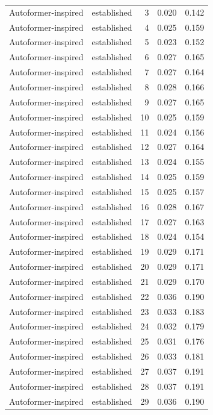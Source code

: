 \begin{tabular}{llrrr}
Autoformer-inspired & established & 3 & 0.020 & 0.142 \\
Autoformer-inspired & established & 4 & 0.025 & 0.159 \\
Autoformer-inspired & established & 5 & 0.023 & 0.152 \\
Autoformer-inspired & established & 6 & 0.027 & 0.165 \\
Autoformer-inspired & established & 7 & 0.027 & 0.164 \\
Autoformer-inspired & established & 8 & 0.028 & 0.166 \\
Autoformer-inspired & established & 9 & 0.027 & 0.165 \\
Autoformer-inspired & established & 10 & 0.025 & 0.159 \\
Autoformer-inspired & established & 11 & 0.024 & 0.156 \\
Autoformer-inspired & established & 12 & 0.027 & 0.164 \\
Autoformer-inspired & established & 13 & 0.024 & 0.155 \\
Autoformer-inspired & established & 14 & 0.025 & 0.159 \\
Autoformer-inspired & established & 15 & 0.025 & 0.157 \\
Autoformer-inspired & established & 16 & 0.028 & 0.167 \\
Autoformer-inspired & established & 17 & 0.027 & 0.163 \\
Autoformer-inspired & established & 18 & 0.024 & 0.154 \\
Autoformer-inspired & established & 19 & 0.029 & 0.171 \\
Autoformer-inspired & established & 20 & 0.029 & 0.171 \\
Autoformer-inspired & established & 21 & 0.029 & 0.170 \\
Autoformer-inspired & established & 22 & 0.036 & 0.190 \\
Autoformer-inspired & established & 23 & 0.033 & 0.183 \\
Autoformer-inspired & established & 24 & 0.032 & 0.179 \\
Autoformer-inspired & established & 25 & 0.031 & 0.176 \\
Autoformer-inspired & established & 26 & 0.033 & 0.181 \\
Autoformer-inspired & established & 27 & 0.037 & 0.191 \\
Autoformer-inspired & established & 28 & 0.037 & 0.191 \\
Autoformer-inspired & established & 29 & 0.036 & 0.190 \\

\end{tabular}
